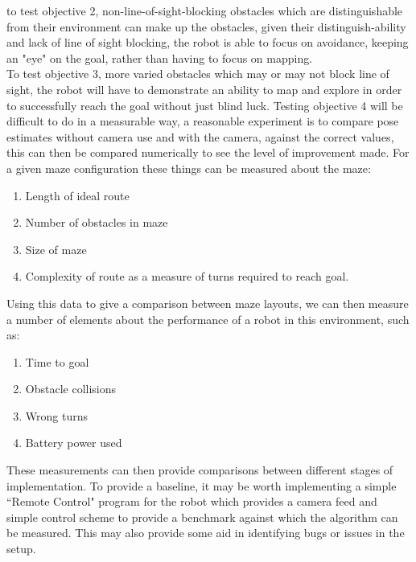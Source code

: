 \documentclass[10pt,a4paper]{report}
\begin{document}
		to test objective 2, non-line-of-sight-blocking obstacles which are distinguishable from their environment can make up the obstacles, given their distinguish-ability and lack of line of sight blocking, the robot is able to focus on avoidance, keeping an "eye" on the goal, rather than having to focus on mapping. \\
		To test objective 3, more varied obstacles which may or may not block line of sight, the robot will have to demonstrate an ability to map and explore in order to successfully reach the goal without just blind luck.
		Testing objective 4 will be difficult to do in a measurable way, a reasonable experiment is to compare pose estimates without camera use and with the camera, against the correct values, this can then be compared numerically to see the level of improvement made. 
		For a given maze configuration these things can be measured about the maze:
		\begin{enumerate}
			\item Length of ideal route
			\item Number of obstacles in maze
			\item Size of maze
			\item Complexity of route as a measure of turns required to reach goal.
		\end{enumerate}
		Using this data to give a comparison between maze layouts, we can then measure a number of elements about the performance of a robot in this environment, such as:
		\begin{enumerate}
			\item Time to goal
			\item Obstacle collisions
			\item Wrong turns
			\item Battery power used
		\end{enumerate}
		These measurements can then provide comparisons between different stages of implementation. To provide a baseline, it may be worth implementing a simple ``Remote Control" program for the robot which provides a camera feed and simple control scheme to provide a benchmark against which the algorithm can be measured. This may also provide some aid in identifying bugs or issues in the setup.
	
\end{document}
